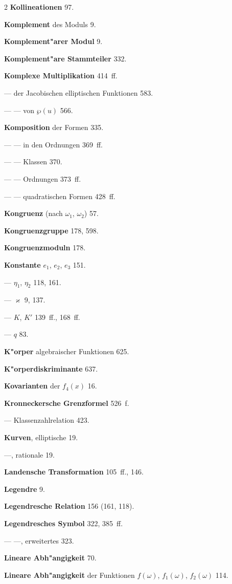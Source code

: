 \documentclass[12pt,a4paper]{article}
\begin{document}
\begin{multicols}{2}
\textbf{Kollineationen} 97.

\textbf{Komplement} des Moduls 9.

\textbf{Komplement"arer Modul} 9.

\textbf{Komplement"are Stammteiler} 332.

\textbf{Komplexe Multiplikation} 414~ff.

--- der Jacobischen elliptischen Funktionen 583.

--- --- von $\wp(u)$ 566.

\textbf{Komposition} der Formen 335.

--- --- in den Ordnungen 369~ff.

--- --- Klassen 370.

--- --- Ordnungen 373~ff.

--- --- quadratischen Formen 428~ff.

\textbf{Kongruenz} (nach $\omega_1$, $\omega_2$) 57.

\textbf{Kongruenzgruppe} 178, 598.

\textbf{Kongruenzmoduln} 178.

\textbf{Konstante} $e_1$, $e_2$, $e_3$ 151.

--- $\eta_1$, $\eta_2$ 118, 161.

--- $\varkappa$ 9, 137.

--- $K$, $K'$ 139~ff., 168~ff.

--- $q$ 83.

\textbf{K"orper} algebraischer Funktionen 625.

\textbf{K"orperdiskriminante} 637.

\textbf{Kovarianten} der $f_4(x)$ 16.

\textbf{Kronneckersche Grenzformel} 526~f.

--- Klassenzahlrelation 423.

\textbf{Kurven}, elliptische 19.

---, rationale 19.

\bigskip

\textbf{Landensche Transformation} 105~ff., 146.

\textbf{Legendre} 9.

\textbf{Legendresche Relation} 156 (161, 118).

\textbf{Legendresches Symbol} 322, 385~ff.

--- ---, erweitertes 323.

\textbf{Lineare Abh"angigkeit} 70.

\columnbreak

\textbf{Lineare Abh"angigkeit} der Funktionen $f(\omega)$, $f_1(\omega)$, $f_2(\omega)$ 114.


\end{multicols}
\end{document}
